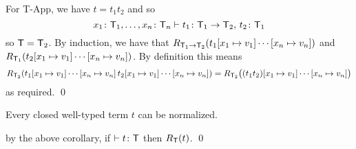 For {\tensc T-App}, we have $t=t_1t_2$ and so
$$ x_1\colon\T_1,\dots,x_n\colon\T_n\vdash t_1\colon\T_1\to\T_2,\,t_2\colon\T_1 $$
so ${\sf T}={\sf T}_2$.
By induction, we have that $R_{\T_1\to\T_2}(t_1[x_1\mapsto v_1]\cdots[x_n\mapsto v_n])$ and $R_{\T_1}(t_2[x_1\mapsto v_1]\cdots[x_n\mapsto v_n])$.
By definition this means
$$ R_{\T_2}(t_1[x_1\mapsto v_1]\cdots[x_n\mapsto v_n]\,t_2[x_1\mapsto v_1]\cdots[x_n\mapsto v_n]) = R_{\T_2}\bigl((t_1t_2)[x_1\mapsto v_1]\cdots[x_n\mapsto v_n]\bigr) $$
as required.
\qed

\bthrm

    Every closed well-typed term $t$ can be normalized.

\ethrm

\Proof by the above corollary, if $\vdash t\colon{\sf T}$ then $R_{{\sf T}}(t)$.
\qed
